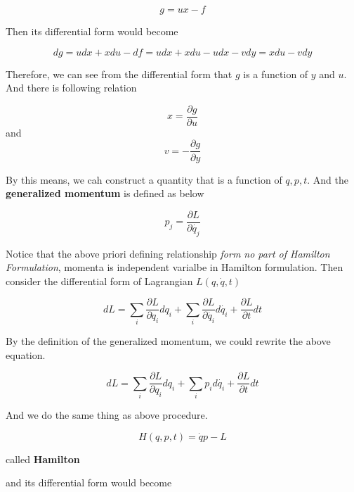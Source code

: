 \documentclass[12pt]{article}
\begin{document}
\begin{center}
    \[ g = ux - f \]    
\end{center}

Then its differential form would become

\begin{center}
    \[dg = udx + xdu - df = udx + xdu - udx - vdy = xdu - vdy\]    
\end{center}

Therefore, we can see from the differential form that $g$ is a function of $y$ and $u$. And there is following relation

\begin{center}
    \[ x = \frac{\partial{g}}{\partial{u}} \] and \[ v = -\frac{\partial{g}}{\partial{y}}\]  
\end{center}

By this means, we cah construct a quantity that is a function of $q, p, t$. And the \textbf{generalized momentum} is defined as below

\begin{center}
    \[ p_j = \frac{\partial{L}}{\partial{\dot{q_j}}} \]
\end{center}

Notice that the above priori defining relationship \textit{form no part of Hamilton Formulation}, momenta is independent varialbe in Hamilton formulation.
Then consider the differential form of Lagrangian $L(q, \dot{q}, t)$

\begin{center}
    \[ dL = \sum_{i}\frac{\partial{L}}{\partial{q_i}} dq_i + \sum_{i}\frac{ \partial{L} }{ \partial{\dot{q_i}} } d\dot{q_i} + \frac{\partial{L}}{\partial{t}} dt\]
\end{center}

By the definition of the generalized momentum, we could rewrite the above equation.

\begin{center}
    \[ dL = \sum_{i} \frac{ \partial{L} }{ \partial{q_i} }dq_i + \sum_{i} p_i d\dot{q_i} + \frac{ \partial{L} }{ \partial{t} }dt\]    
\end{center}

And we do the same thing as above procedure.

\begin{center}
    \[ H(q, p, t) = \dot{q}p - L\]
\end{center}

called \textbf{Hamilton}

and its differential form would become 
\end{document}
